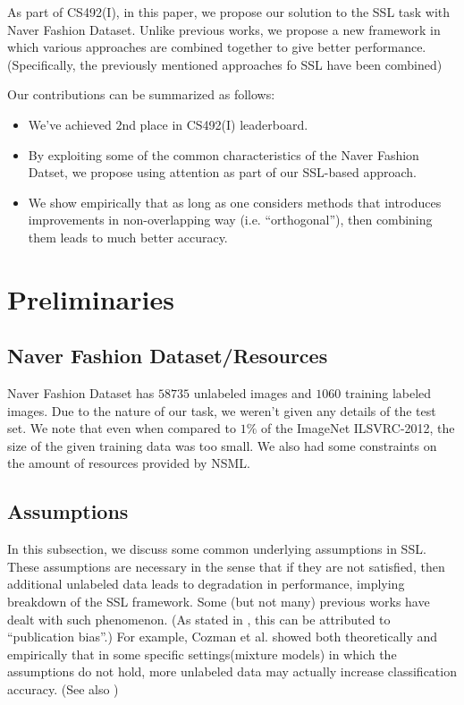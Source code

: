 \documentclass[10pt,twocolumn,letterpaper]{article}
\begin{document}
As part of CS492(I), in this paper, we propose our solution to the SSL task with Naver Fashion Dataset.
Unlike previous works, we propose a new framework in which various approaches are combined together to give better performance.
(Specifically, the previously mentioned approaches fo SSL have been combined)

Our contributions can be summarized as follows:
\begin{itemize}
    \item We've achieved $2$nd place in CS492(I) leaderboard.

    \item By exploiting some of the common characteristics of the Naver Fashion Datset, we propose using attention as part of our SSL-based approach.
    
    \item We show empirically that as long as one considers methods that introduces improvements in non-overlapping way (i.e. \enquote{orthogonal}), then combining them leads to much better accuracy.
\end{itemize}



\section{Preliminaries}

\subsection{Naver Fashion Dataset/Resources}
Naver Fashion Dataset has $58735$ unlabeled images and $1060$ training labeled images.
Due to the nature of our task, we weren't given any details of the test set.
We note that even when compared to $1\%$ of the ImageNet ILSVRC-2012\cite{ILSVRC15}, the size of the given training data was too small.
We also had some constraints on the amount of resources provided by NSML\cite{NSML}.


\subsection{Assumptions}
In this subsection, we discuss some common underlying assumptions in SSL.
These assumptions are necessary in the sense that if they are not satisfied, then additional unlabeled data leads to degradation in performance, implying breakdown of the SSL framework.
Some (but not many) previous works have dealt with such phenomenon. (As stated in \cite{Zhu05}, this can be attributed to \enquote{publication bias}.)
For example, Cozman et al.\cite{CCC02} showed both theoretically and empirically that in some specific settings(mixture models) in which the assumptions do not hold, more unlabeled data may actually increase classification accuracy.
(See also \cite{Elworthy94})
\end{document}
